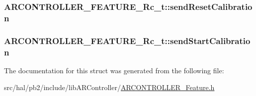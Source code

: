 \subsubsection[{\texorpdfstring{send\+Reset\+Calibration}{sendResetCalibration}}]{ A\+R\+C\+O\+N\+T\+R\+O\+L\+L\+E\+R\+\_\+\+F\+E\+A\+T\+U\+R\+E\+\_\+\+Rc\+\_\+t\+::send\+Reset\+Calibration}\hypertarget{struct_a_r_c_o_n_t_r_o_l_l_e_r___f_e_a_t_u_r_e___rc__t_af73890e682cd2ca9ae04494f8154f0ac}{}\label{struct_a_r_c_o_n_t_r_o_l_l_e_r___f_e_a_t_u_r_e___rc__t_af73890e682cd2ca9ae04494f8154f0ac}
\subsubsection[{\texorpdfstring{send\+Start\+Calibration}{sendStartCalibration}}]{ A\+R\+C\+O\+N\+T\+R\+O\+L\+L\+E\+R\+\_\+\+F\+E\+A\+T\+U\+R\+E\+\_\+\+Rc\+\_\+t\+::send\+Start\+Calibration}\hypertarget{struct_a_r_c_o_n_t_r_o_l_l_e_r___f_e_a_t_u_r_e___rc__t_a99cbdb86a953966350c31d2c4e7c4665}{}\label{struct_a_r_c_o_n_t_r_o_l_l_e_r___f_e_a_t_u_r_e___rc__t_a99cbdb86a953966350c31d2c4e7c4665}


The documentation for this struct was generated from the following file\+:\begin{DoxyCompactItemize}
\item 
src/hal/pb2/include/lib\+A\+R\+Controller/\hyperlink{_a_r_c_o_n_t_r_o_l_l_e_r___feature_8h}{A\+R\+C\+O\+N\+T\+R\+O\+L\+L\+E\+R\+\_\+\+Feature.\+h}\end{DoxyCompactItemize}
